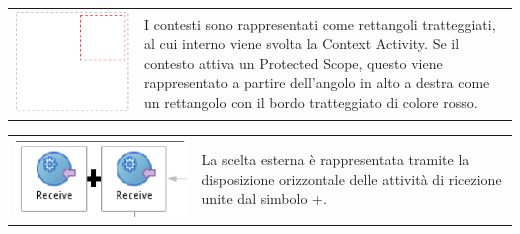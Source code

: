 \begin{tabular}{cp{}}
\includegraphics[scale=0.30]{blide/dia/BlideContext} & 
\parbox[b][2.2cm][t]{0.6 \textwidth}{I contesti sono rappresentati come
rettangoli tratteggiati, al cui interno viene svolta la Context Activity. Se il
contesto attiva un Protected Scope, questo viene rappresentato a partire
dell'angolo in alto a destra come un rettangolo con il bordo tratteggiato di
colore rosso.}
\end{tabular}

\vspace{1.5cm} 

\begin{tabular}{cp{}}
\includegraphics[scale=0.42]{blide/dia/BlidePick} & 
\parbox[b][1.5cm][t]{0.6 \textwidth}{La scelta esterna è rappresentata tramite
la disposizione orizzontale delle attività di ricezione unite dal simbolo +.}
\end{tabular}

